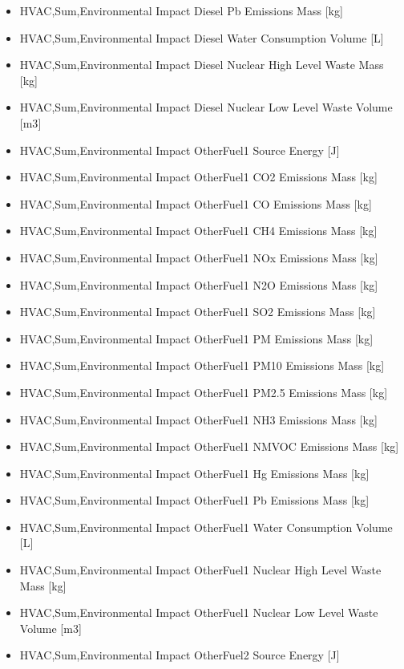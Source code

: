 \begin{itemize}
\item
  HVAC,Sum,Environmental Impact Diesel Pb Emissions Mass {[}kg{]}
\item
  HVAC,Sum,Environmental Impact Diesel Water Consumption Volume {[}L{]}
\item
  HVAC,Sum,Environmental Impact Diesel Nuclear High Level Waste Mass {[}kg{]}
\item
  HVAC,Sum,Environmental Impact Diesel Nuclear Low Level Waste Volume {[}m3{]}
\item
  HVAC,Sum,Environmental Impact OtherFuel1 Source Energy {[}J{]}
\item
  HVAC,Sum,Environmental Impact OtherFuel1 CO2 Emissions Mass {[}kg{]}
\item
  HVAC,Sum,Environmental Impact OtherFuel1 CO Emissions Mass {[}kg{]}
\item
  HVAC,Sum,Environmental Impact OtherFuel1 CH4 Emissions Mass {[}kg{]}
\item
  HVAC,Sum,Environmental Impact OtherFuel1 NOx Emissions Mass {[}kg{]}
\item
  HVAC,Sum,Environmental Impact OtherFuel1 N2O Emissions Mass {[}kg{]}
\item
  HVAC,Sum,Environmental Impact OtherFuel1 SO2 Emissions Mass {[}kg{]}
\item
  HVAC,Sum,Environmental Impact OtherFuel1 PM Emissions Mass {[}kg{]}
\item
  HVAC,Sum,Environmental Impact OtherFuel1 PM10 Emissions Mass {[}kg{]}
\item
  HVAC,Sum,Environmental Impact OtherFuel1 PM2.5 Emissions Mass {[}kg{]}
\item
  HVAC,Sum,Environmental Impact OtherFuel1 NH3 Emissions Mass {[}kg{]}
\item
  HVAC,Sum,Environmental Impact OtherFuel1 NMVOC Emissions Mass {[}kg{]}
\item
  HVAC,Sum,Environmental Impact OtherFuel1 Hg Emissions Mass {[}kg{]}
\item
  HVAC,Sum,Environmental Impact OtherFuel1 Pb Emissions Mass {[}kg{]}
\item
  HVAC,Sum,Environmental Impact OtherFuel1 Water Consumption Volume {[}L{]}
\item
  HVAC,Sum,Environmental Impact OtherFuel1 Nuclear High Level Waste Mass {[}kg{]}
\item
  HVAC,Sum,Environmental Impact OtherFuel1 Nuclear Low Level Waste Volume {[}m3{]}
\item
  HVAC,Sum,Environmental Impact OtherFuel2 Source Energy {[}J{]}

\end{itemize}

